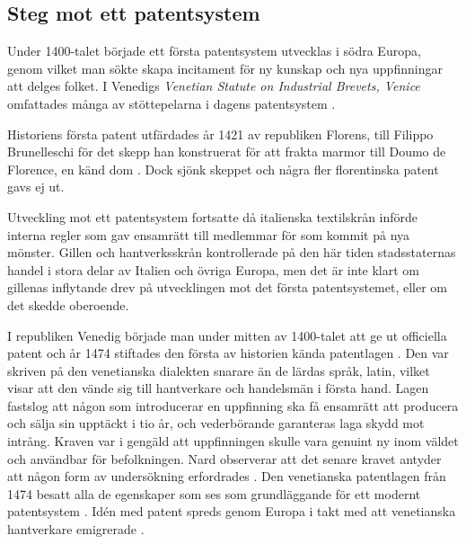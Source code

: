 \subsection{Steg mot ett patentsystem} 

Under 1400-talet började ett första patentsystem utvecklas i södra Europa, genom vilket man sökte skapa incitament för ny kunskap och nya uppfinningar att delges folket. 
I Venedigs \emph{Venetian Statute on Industrial Brevets, Venice} omfattades många av stöttepelarna i dagens patentsystem \cite{nard}.

Historiens första patent utfärdades år 1421 av republiken Florens, till Filippo Brunelleschi för det skepp han konstruerat för att frakta marmor till Doumo de Florence, en känd dom \cite{frumkin}. 
Dock sjönk skeppet och några fler florentinska patent gavs ej ut.

Utveckling mot ett patentsystem fortsatte då italienska textilskrån införde interna regler som gav ensamrätt till medlemmar för som kommit på nya mönster.
Gillen och hantverksskrån kontrollerade på den här tiden stadsstaternas handel i stora delar av Italien och övriga Europa, men det är inte klart om gillenas inflytande drev på utvecklingen mot det första patentsystemet, eller om det skedde oberoende.

I republiken Venedig började man under mitten av 1400-talet att ge ut officiella patent och år 1474 stiftades den första av historien kända patentlagen \cite{frumkin}.
Den var skriven på den venetianska dialekten snarare än de lärdas språk, latin, vilket visar att den vände sig till hantverkare och handelsmän i första hand.
Lagen fastslog att någon som introducerar en uppfinning ska få ensamrätt att producera och sälja sin upptäckt i tio år, och vederbörande garanteras laga skydd mot intrång. 
Kraven var i gengäld att uppfinningen skulle vara genuint ny inom väldet och användbar för befolkningen. 
Nard observerar att det senare kravet antyder att någon form av undersökning erfordrades \cite{nard}. 
Den venetianska patentlagen från 1474 besatt alla de egenskaper som ses som grundläggande för ett modernt patentsystem \cite{nard}. Idén med patent spreds genom Europa i takt med att venetianska hantverkare emigrerade \cite{nard}. 



